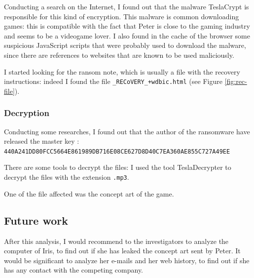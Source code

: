 \documentclass[12pt]{article}
\begin{document}
Conducting a search on the Internet, I found out that the malware TeslaCrypt is responsible for this kind of encryption. This malware is common downloading games: this is compatible with the fact that Peter is close to the gaming industry and seems to be a videogame lover. I also found in the cache of the browser some suspicious JavaScript scripts that were probably used to download the malware, since there are references to websites that are known to be used maliciously.

I started looking for the ransom note, which is usually a file with the recovery instructions: indeed I found the file \texttt{\_RECoVERY\_+wdbic.html} (see Figure \ref{fig:rec-file}).

\subsubsection{Decryption}
Conducting some researches, I found out that the author of the ransomware have released the master key \cite{teslacrypt-masterkey}: \\
\texttt{440A241DD80FCC5664E861989DB716E08CE627D8D40C7EA360AE855C727A49EE}

There are some tools to decrypt the files: I used the tool TeslaDecrypter \cite{tesla-decrypt} to decrypt the files with the extension \texttt{.mp3}.

One of the file affected was the concept art of the game.

\subsection{Future work}

After this analysis, I would recommend to the investigators to analyze the computer of Iris, to find out if she has leaked the concept art sent by Peter. It would be significant to analyze her e-mails and her web history, to find out if she has any contact with the competing company.

\printbibliography[title={References}]
\end{document}
